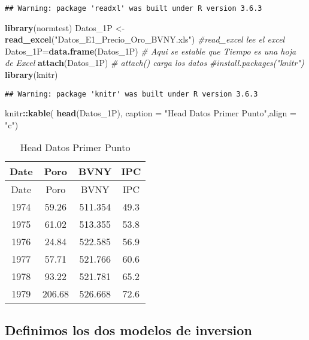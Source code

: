 \documentclass[
]{article}
\newenvironment{Shaded}{\begin{snugshade}}{\end{snugshade}}
\newcommand{\CommentTok}[1]{\textcolor[rgb]{0.56,0.35,0.01}{\textit{#1}}}
\newcommand{\DataTypeTok}[1]{\textcolor[rgb]{0.13,0.29,0.53}{#1}}
\newcommand{\KeywordTok}[1]{\textcolor[rgb]{0.13,0.29,0.53}{\textbf{#1}}}
\newcommand{\NormalTok}[1]{#1}
\newcommand{\OperatorTok}[1]{\textcolor[rgb]{0.81,0.36,0.00}{\textbf{#1}}}
\newcommand{\StringTok}[1]{\textcolor[rgb]{0.31,0.60,0.02}{#1}}
\begin{document}
\begin{verbatim}
## Warning: package 'readxl' was built under R version 3.6.3
\end{verbatim}

\begin{Shaded}
\begin{Highlighting}[]
\KeywordTok{library}\NormalTok{(normtest)}
\NormalTok{Datos_1P <-}\StringTok{ }\KeywordTok{read_excel}\NormalTok{(}\StringTok{"Datos_E1_Precio_Oro_BVNY.xls"}\NormalTok{) }\CommentTok{#read_excel lee el excel}
\NormalTok{Datos_1P=}\KeywordTok{data.frame}\NormalTok{(Datos_1P) }\CommentTok{# Aqui se estable que Tiempo es una hoja de Excel}
\KeywordTok{attach}\NormalTok{(Datos_1P) }\CommentTok{# attach() carga los datos }
\CommentTok{#install.packages("knitr")}
\KeywordTok{library}\NormalTok{(knitr)}
\end{Highlighting}
\end{Shaded}

\begin{verbatim}
## Warning: package 'knitr' was built under R version 3.6.3
\end{verbatim}

\begin{Shaded}
\begin{Highlighting}[]
\NormalTok{knitr}\OperatorTok{::}\KeywordTok{kable}\NormalTok{(}
  \KeywordTok{head}\NormalTok{(Datos_1P), }\DataTypeTok{caption =} \StringTok{"Head Datos Primer Punto"}\NormalTok{,}\DataTypeTok{align =} \StringTok{"c"}\NormalTok{)}
\end{Highlighting}
\end{Shaded}

\begin{longtable}[]{@{}cccc@{}}
\caption{Head Datos Primer Punto}\tabularnewline
\toprule
Date & Poro & BVNY & IPC\tabularnewline
\midrule
\endfirsthead
\toprule
Date & Poro & BVNY & IPC\tabularnewline
\midrule
\endhead
1974 & 59.26 & 511.354 & 49.3\tabularnewline
1975 & 61.02 & 513.355 & 53.8\tabularnewline
1976 & 24.84 & 522.585 & 56.9\tabularnewline
1977 & 57.71 & 521.766 & 60.6\tabularnewline
1978 & 93.22 & 521.781 & 65.2\tabularnewline
1979 & 206.68 & 526.668 & 72.6\tabularnewline
\bottomrule
\end{longtable}

\hypertarget{definimos-los-dos-modelos-de-inversion}{%
\subsection{Definimos los dos modelos de
inversion}\label{definimos-los-dos-modelos-de-inversion}}
\end{document}
